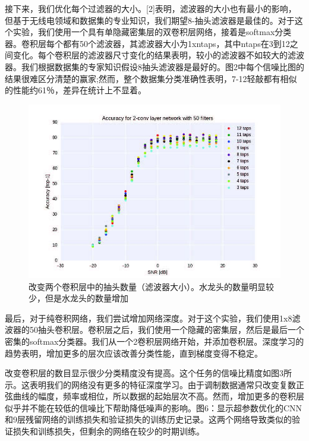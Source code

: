 接下来，我们优化每个过滤器的大小。[2]表明，滤波器的大小也有最小的影响，但基于无线电领域和数据集的专业知识，我们期望8-抽头滤波器是最佳的。对于这个实验，我们使用一个具有单隐藏密集层的双卷积层网络，接着是softmax分类器。卷积层每个都有50个滤波器，其滤波器大小为1xntaps，其中ntaps在3到12之间变化。每个卷积层的滤波器尺寸变化的结果表明，较小的滤波器不如较大的滤波器。我们根据数据集的专家知识假设8抽头滤波器是最好的。图2中每个信噪比图的结果很难区分清楚的赢家;然而，整个数据集分类准确性表明，7-12轻敲都有相似的性能约61％，差异在统计上不显着。\par
\begin{figure}[!h]
	\centering
	\includegraphics[scale=1]{figures/chapter_5/fig2}
	\caption{改变两个卷积层中的抽头数量（滤波器大小）。水龙头的数量明显较少，但是水龙头的数量增加}\label{fig_5_2}
\end{figure}
最后，对于纯卷积网络，我们尝试增加网络深度。对于这个实验，我们使用1x8滤波器的50抽头卷积层。卷积层之后，我们使用一个隐藏的密集层，然后是最后一个密集的softmax分类器。我们从一个2卷积层网络开始，并添加卷积层。深度学习的趋势表明，增加更多的层次应该改善分类性能，直到梯度变得不稳定。\par
改变卷积层的数目显示很少分类精度没有提高。这个任务的信噪比精度如图3所示。这表明我们的网络没有更多的特征深度学习。由于调制数据通常只改变复数正弦曲线的幅度，频率或相位，所以数据的起始层次不高。然而，增加更多的卷积层似乎并不能在较低的信噪比下帮助降低噪声的影响。图6：显示超参数优化的CNN和9层残留网络的训练损失和验证损失的训练历史记录。这两个网络导致类似的验证损失和训练损失，但剩余的网络在较少的时期训练。\par
